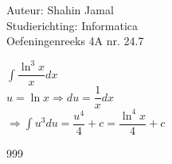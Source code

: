 \documentclass[a4paper]{article}
\begin{document}
  
\noindent \large Auteur: Shahin Jamal \\
\noindent \large Studierichting: Informatica\\
\noindent \large Oefeningenreeks 4A nr. 24.7\\

\medskip

\normalsize

$\displaystyle\int \dfrac{\ln^3x}{x} dx$\\

$u = \ln x \Rightarrow du = \dfrac{1}{x} dx$\\

$\Rightarrow \displaystyle\int u^3 du = \dfrac{u^4}{4} + c = \dfrac{\ln^4x}{4} + c$\\

\begin{thebibliography}{999}
\end{thebibliography}
\end{document}
